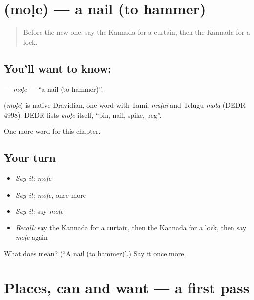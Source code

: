 \section[\texorpdfstring{\kn{ಮೊಳೆ} (moḷe)}{ಮೊಳೆ (moḷe)}]{ (moḷe) — a nail (to hammer)}

\label{lesson:KA-C116-mole}



\begin{quote}
Before the new one: say the Kannada for a curtain, then the Kannada for a lock.
\end{quote}

\subsection*{You'll want to know: }
\textbf{} — \emph{moḷe} — \textquotedblleft{}a nail (to hammer)\textquotedblright{}.

\begin{cousinweb}
\textbf{} (\emph{moḷe}) is native Dravidian, one word with Tamil \emph{muḷai} and Telugu \emph{mola} (DEDR 4998). DEDR lists \emph{moḷe} itself, \textquotedblleft{}pin, nail, spike, peg\textquotedblright{}.
\end{cousinweb}

\begin{grammarlens}[title={What you've built}]
One more word for this chapter.
\end{grammarlens}

\subsection*{Your turn}
\begin{itemize}
\raggedright
  \item \emph{Say it:} \emph{moḷe}
  \item \emph{Say it:} \emph{moḷe}, once more
  \item \emph{Say it:} say \emph{moḷe}
  \item \emph{Recall:} say the Kannada for a curtain, then the Kannada for a lock, then say \emph{moḷe} again
\end{itemize}

\begin{tcolorbox}[breakable,colback=teal!4,colframe=teal!35!black,title={Before you move on}]
What does  mean? (\textquotedblleft{}A nail (to hammer)\textquotedblright{}.) Say it once more.
\end{tcolorbox}
\section[(dialogue)]{Places, can and want — a first pass}

